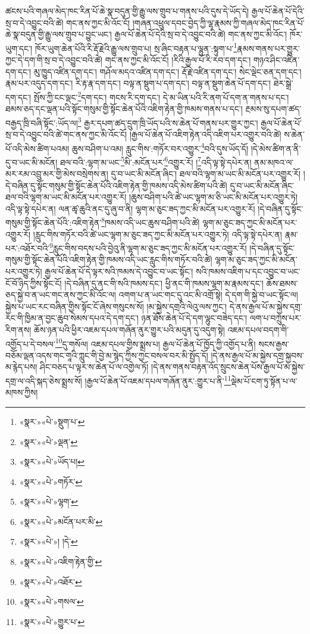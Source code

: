 ཚངས་པའི་གཞལ་མེད་ཁང་རིན་པོ་ཆེ་སྣ་བདུན་གྱི་རྒྱུ་ལས་གྲུབ་པ་གནས་པའི་དུས་དེ་ཡོད་དེ། རྒྱལ་པོ་ཆེན་པོ་དེའི་སྲ་བ་དེ་འབྱུང་བའི་ཚེ། གང་ནས་ཀྱང་མི་འོང་ངོ། །གཞན་འཕྲུལ་དབང་བྱེད་ཀྱི་ལྷ་རྣམས་ཀྱི་གཞལ་མེད་ཁང་རིན་པོ་ཆེ་སྣ་བདུན་གྱི་རྒྱུ་ལས་གྲུབ་པ་བྱུང་ཡང་། རྒྱལ་པོ་ཆེན་པོ་དེའི་སྲ་བ་དེ་འབྱུང་བའི་ཚེ། གང་ནས་ཀྱང་མི་འོང་། ཁོར་ཡུག་དང་། ཁོར་ཡུག་ཆེན་པོའི་རི་རྡོ་རྗེའི་རྒྱུ་ལས་གྲུབ་པ། སྲ་ཞིང་བརྟན་པ་ལྷུན་:སྟུག་པ་\footnote{«སྣར་»«པེ་»སྡུག་པ་}རྣམས་གནས་པར་གྱུར་ཀྱང་དེ་དག་གི་སྲ་བ་དེ་འབྱུང་བའི་ཚེ། གང་ནས་ཀྱང་མི་འོང་ངོ། །རིའི་རྒྱལ་པོ་རི་རབ་དག་དང་། གཉའ་ཤིང་འཛིན་དག་དང་། མུ་ཁྱུད་འཛིན་དག་དང་། གཤོལ་མདའ་འཛིན་དག་དང་། རྡོ་རྗེ་འཛིན་དག་དང་། སེང་ལྡེང་ཅན་དག་དང་། རྣམ་པར་འདུད་དག་དང་། རི་རྟ་རྣ་དག་དང་། བལྟ་ན་སྡུག་པ་དག་དང་། བལྟ་ན་སྡུག་ཆེན་པོ་དག་དང་། ཐེར་སྒྲེ་དག་དང་། སྤོས་ཀྱི་ངང་ལྡང་\footnote{«སྣར་»«པེ་»ལྡན་}དག་དང་། གངས་རི་དག་དང་། དེ་མ་ཡིན་པའི་རི་ནག་པོ་དག་ན་གནས་པ་དང་། ཐམས་ཅད་དང་ལྡན་པའི་སྟོང་གསུམ་གྱི་སྟོང་ཆེན་པོའི་འཇིག་རྟེན་གྱི་ཁམས་གནས་པ་དང་། རྔམས་སུ་དཔག་ཚད་བརྒྱད་ཁྲི་བཞི་སྟོང་:ཡོད་ལ།\footnote{«སྣར་»«པེ་»ཡོད་པ།} རྒྱར་དཔག་ཚད་དྲུག་ཁྲི་ཡོད་པའི་ས་ཆེན་པོ་གནས་པར་གྱུར་ཀྱང་། རྒྱལ་པོ་ཆེན་པོ་སྲ་བ་དེ་འབྱུང་བའི་ཚེ་གང་ནས་ཀྱང་མི་འོང་ངོ། །རྒྱལ་པོ་ཆེན་པོ་འཇིག་རྟེན་འདི་འཇིག་པར་འགྱུར་བའི་ཚེ། ས་ཆེན་པོ་འདི་མེས་ཚིག་པའམ། ཆུས་བཤིག་པ་འམ། རླུང་གིས་:གཏོར་བར་འགྱུར་\footnote{«སྣར་»«པེ་»གཏོར་}བའི་དུས་ཡོད་དོ། །དེ་མེས་ཚིག་ན་ནི་དུ་བ་ཡང་མི་མངོན། ཐལ་བའི་:ལྷག་མ་ཡང་\footnote{«སྣར་»«པེ་»ལྷག་}མི་:མངོན་པར་\footnote{«སྣར་»«པེ་»མངོན་པར་མི་}འགྱུར་རོ། །\footnote{«སྣར་»«པེ་»། །དེ་}འདི་ལྟ་སྟེ་དཔེར་ན། ནམ་མཁའ་ལ་མར་རམ་འབྲུ་མར་གྱི་མེས་བསྲེགས་ན། དུ་བ་ཡང་མི་མངོན་ཞིང་། ཐལ་བའི་ལྷག་མ་ཡང་མི་མངོན་པར་འགྱུར་རོ། །དེ་བཞིན་དུ་སྟོང་གསུམ་གྱི་སྟོང་ཆེན་པོའི་འཇིག་རྟེན་གྱི་ཁམས་འདི་མེས་ཚིག་པའི་ཚེ། དུ་བ་ཡང་མི་མངོན་ཞིང་ཐལ་བའི་ལྷག་མ་ཡང་མི་མངོན་པར་འགྱུར་རོ། །ཆུས་བཤིག་པའི་ཚེ་ཡང་ལྷག་མ་ཅི་ཡང་མི་མངོན་པར་འགྱུར་ཏེ། འདི་ལྟ་སྟེ་དཔེར་ན། ལན་ཚྭ་ཆུའི་ནང་དུ་ཞུ་བ་ནི། ལྷག་མ་ཅུང་ཟད་ཀྱང་མི་མངོན་པར་འགྱུར་རོ། །དེ་བཞིན་དུ་སྟོང་གསུམ་གྱི་སྟོང་ཆེན་པོའི་:འཇིག་རྟེན་\footnote{«སྣར་»«པེ་»འཇིག་རྟེན་གྱི་}ཁམས་འདི་ཡང་ཆུས་བཤིག་པའི་ཚེ། ལྷག་མ་ཅུང་ཟད་ཀྱང་མི་མངོན་པར་འགྱུར་རོ། །རླུང་གིས་གཏོར་བའི་ཚེ་ཡང་ལྷག་མ་ཅུང་ཟད་ཀྱང་མི་མངོན་པར་འགྱུར་ཏེ། འདི་ལྟ་སྟེ་དཔེར་ན། རྣམ་པར་:འཐོར་བའི་\footnote{«སྣར་»«པེ་»འཐོར་}རླུང་གིས་བདས་པའི་བྱེའུ་ནི་ལྷག་མ་ཅུང་ཟད་ཀྱང་མི་མངོན་པར་འགྱུར་རོ། །དེ་བཞིན་དུ་སྟོང་གསུམ་གྱི་སྟོང་ཆེན་པོའི་འཇིག་རྟེན་གྱི་ཁམས་འདི་ཡང་རླུང་གིས་གཏོར་བའི་ཚེ། ལྷག་མ་ཅུང་ཟད་ཀྱང་མི་མངོན་པར་འགྱུར་ཏེ། རྒྱལ་པོ་ཆེན་པོ་དེ་ལྟར་སའི་ཁམས་དེ་འབྱུང་བ་ཡང་སྟོང་། སའི་ཁམས་འཇིག་པ་དང་འབྱུང་བ་ཡང་ངོ་བོ་ཉིད་ཀྱིས་སྟོང་ངོ། །དེ་བཞིན་དུ་ནང་གི་སའི་ཁམས་དང་། ཕྱི་ནང་གི་ཁམས་ལྷག་མ་རྣམས་དང་། ཆོས་ཐམས་ཅད་སྐྱེ་བ་ན་ཡང་གང་ནས་ཀྱང་མི་འོང་ལ། འགག་པ་ན་ཡང་གང་དུ་འང་མི་འགྲོ་སྟེ། དེ་དག་གི་སྐྱེ་བ་ཡང་སྟོང་ལ། སྐྱེས་པ་ཡང་རང་བཞིན་གྱིས་སྟོང་ངོ་ཞེས་གསུངས་སོ། །མ་སྐྱེས་དགྲའི་ལེའུ་ལས་ཀྱང་། དེ་ནས་རྒྱལ་པོ་མ་སྐྱེས་དགྲ་རང་གི་ཁྱིམ་ན་བྱང་ཆུབ་སེམས་དཔའ་དེ་དག་དང་། ཉན་ཐོས་ཆེན་པོ་དེ་དག་ལྷུང་བཟེད་དང་། ལག་པ་བཀྲུས་པར་རིག་ནས། ཆོས་ཉན་པའི་ཕྱིར་འཇམ་དཔལ་གཞོན་ནུར་གྱུར་པའི་མདུན་དུ་འདུག་སྟེ། འཇམ་དཔལ་བདག་གི་འགྱོད་པ་དེ་བསལ་\footnote{«སྣར་»«པེ་»གསལ་}དུ་གསོལ། འཇམ་དཔལ་གྱིས་སྨྲས་པ། རྒྱལ་པོ་ཆེན་པོ་ཁྱོད་ཀྱི་འགྱོད་པ་ནི། སངས་རྒྱས་བཅོམ་ལྡན་འདས་གང་གཱའི་ཀླུང་གི་བྱེ་མ་སྙེད་ཀྱིས་ཀྱང་བསལ་བར་མི་སྤྱོད་དོ། །དེ་ནས་རྒྱལ་པོ་མ་སྐྱེས་དགྲ་སྐྱབས་མ་རྙེད་པས། ཤིང་བཅད་པ་ལྟར་ས་ཆེན་པོ་ལ་འགྱེལ་ཏོ། །དེ་ནས་གནས་བརྟན་འོད་སྲུངས་ཆེན་པོས་རྒྱལ་པོ་མ་སྐྱེས་དགྲ་ལ་འདི་སྐད་ཅེས་སྨྲས་སོ། །རྒྱལ་པོ་ཆེན་པོ་འཇམ་དཔལ་གཞོན་ནུར་:གྱུར་པ་ནི་\footnote{«སྣར་»«པེ་»གྱུར་པ་}ལྡེམ་པོ་ངག་ཏུ་སྟོན་པ་ལ་མཁས་ཀྱིས། 